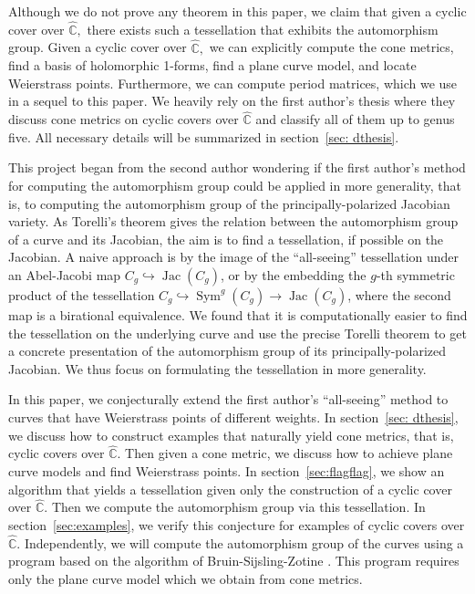 \documentclass[12pt,reqno]{amsart}
\DeclareMathOperator{\Jac}{Jac}
\DeclareMathOperator{\Sym}{Sym}
\newcommand{\C}{\mathbb{C}}
\theoremstyle{definition}
\theoremstyle{remark}
\begin{document}
Although we do not prove any theorem in this paper, we claim that given a cyclic cover over $\widehat{\C},$ there exists such a tessellation that exhibits the automorphism group. Given a cyclic cover over $\widehat{\C},$ we can explicitly compute the cone metrics, find a basis of holomorphic 1-forms, find a plane curve model, and locate Weierstrass points. Furthermore, we can compute period matrices, which we use in a sequel to this paper. We heavily rely on the first author's thesis \cite{dthesis} where they discuss cone metrics on cyclic covers over $\widehat{\C}$ and classify all of them up to genus five. All necessary details will be summarized in section~\ref{sec: dthesis}. 

This project began from the second author wondering if the first author's method for computing the automorphism group could be applied in more generality, that is, to computing the automorphism group of the principally-polarized Jacobian variety. As Torelli's theorem gives the relation between the automorphism group of a curve and its Jacobian, the aim is to find a tessellation, if possible on the Jacobian. A naive approach is by the image of the ``all-seeing'' tessellation under an Abel-Jacobi map $C_g \hookrightarrow \Jac(C_g)$, or by the embedding the $g$-th symmetric product of the tessellation $C_g \hookrightarrow \Sym^g(C_g) \to \Jac(C_g)$, where the second map is a birational equivalence. We found that it is computationally easier to find the tessellation on the underlying curve and use the precise Torelli theorem to get a concrete presentation of the automorphism group of its principally-polarized Jacobian. We thus focus on formulating the tessellation in more generality.

In this paper, we conjecturally extend the first author's ``all-seeing'' method to curves that have Weierstrass points of different weights. In section~\ref{sec: dthesis}, we discuss how to construct examples that naturally yield cone metrics, that is, cyclic covers over $\widehat{\C}.$ Then given a cone metric, we discuss how to achieve plane curve models and find Weierstrass points. In section~\ref{sec:flagflag}, we show an algorithm that yields a tessellation given only the construction of a cyclic cover over $\widehat{\C}.$ Then we compute the automorphism group via this tessellation. In section~\ref{sec:examples}, we verify this conjecture for examples of cyclic covers over $\widehat{\C}.$ Independently, we will compute the automorphism group of the curves using a program based on the algorithm of Bruin-Sijsling-Zotine \cite{jeroen}. This program requires only the plane curve model which we obtain from cone metrics. 
\end{document}

